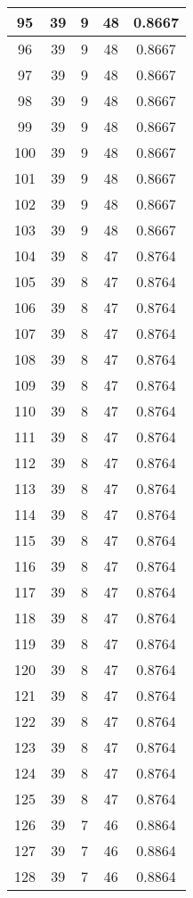 \documentclass[letterpaper, 12pt]{article}
\begin{document}
\begin{longtable}{|c|c|c|c|c|}
95 & 39 & 9 & 48 & 0.8667 \\
\hline
96 & 39 & 9 & 48 & 0.8667 \\
\hline
97 & 39 & 9 & 48 & 0.8667 \\
\hline
98 & 39 & 9 & 48 & 0.8667 \\
\hline
99 & 39 & 9 & 48 & 0.8667 \\
\hline
100 & 39 & 9 & 48 & 0.8667 \\
\hline
101 & 39 & 9 & 48 & 0.8667 \\
\hline
102 & 39 & 9 & 48 & 0.8667 \\
\hline
103 & 39 & 9 & 48 & 0.8667 \\
\hline
104 & 39 & 8 & 47 & 0.8764 \\
\hline
105 & 39 & 8 & 47 & 0.8764 \\
\hline
106 & 39 & 8 & 47 & 0.8764 \\
\hline
107 & 39 & 8 & 47 & 0.8764 \\
\hline
108 & 39 & 8 & 47 & 0.8764 \\
\hline
109 & 39 & 8 & 47 & 0.8764 \\
\hline
110 & 39 & 8 & 47 & 0.8764 \\
\hline
111 & 39 & 8 & 47 & 0.8764 \\
\hline
112 & 39 & 8 & 47 & 0.8764 \\
\hline
113 & 39 & 8 & 47 & 0.8764 \\
\hline
114 & 39 & 8 & 47 & 0.8764 \\
\hline
115 & 39 & 8 & 47 & 0.8764 \\
\hline
116 & 39 & 8 & 47 & 0.8764 \\
\hline
117 & 39 & 8 & 47 & 0.8764 \\
\hline
118 & 39 & 8 & 47 & 0.8764 \\
\hline
119 & 39 & 8 & 47 & 0.8764 \\
\hline
120 & 39 & 8 & 47 & 0.8764 \\
\hline
121 & 39 & 8 & 47 & 0.8764 \\
\hline
122 & 39 & 8 & 47 & 0.8764 \\
\hline
123 & 39 & 8 & 47 & 0.8764 \\
\hline
124 & 39 & 8 & 47 & 0.8764 \\
\hline
125 & 39 & 8 & 47 & 0.8764 \\
\hline
126 & 39 & 7 & 46 & 0.8864 \\
\hline
127 & 39 & 7 & 46 & 0.8864 \\
\hline
128 & 39 & 7 & 46 & 0.8864 \\

\end{longtable}
\end{document}
